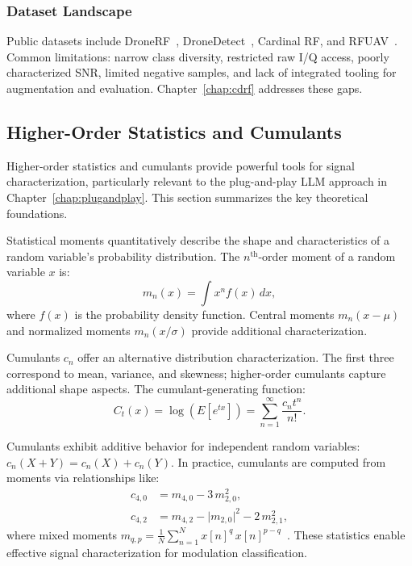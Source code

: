 \subsubsection{Dataset Landscape}

Public datasets include DroneRF~\cite{allahham2019dronerf}, DroneDetect~\cite{5jjj-1m32-21}, Cardinal RF, and RFUAV~\cite{rfuav}. Common limitations: narrow class diversity, restricted raw I/Q access, poorly characterized SNR, limited negative samples, and lack of integrated tooling for augmentation and evaluation. Chapter~\ref{chap:cdrf} addresses these gaps.


\subsection{Higher-Order Statistics and Cumulants}
\label{sec:higher_order_stats}

Higher-order statistics and cumulants provide powerful tools for signal characterization, particularly relevant to the plug-and-play LLM approach in Chapter~\ref{chap:plugandplay}. This section summarizes the key theoretical foundations.

Statistical moments quantitatively describe the shape and characteristics of a random variable's probability distribution. The $n^{\mathrm{th}}$-order moment of a random variable $x$ is:
\begin{equation}
    m_n(x) = \int x^n f(x) \, dx,
\end{equation}
where $f(x)$ is the probability density function. Central moments $m_n(x-\mu)$ and normalized moments $m_n(x/\sigma)$ provide additional characterization.

Cumulants $c_n$ offer an alternative distribution characterization. The first three correspond to mean, variance, and skewness; higher-order cumulants capture additional shape aspects. The cumulant-generating function:
\begin{equation}
    C_t(x) = \log\left(E\left[e^{tx}\right]\right) = \sum_{n=1}^{\infty} \frac{c_n t^n}{n!}.
\end{equation}

Cumulants exhibit additive behavior for independent random variables: $c_n(X+Y) = c_n(X) + c_n(Y)$. In practice, cumulants are computed from moments via relationships like:
\begin{align}
  c_{4,0} &= m_{4,0} - 3\,m_{2,0}^2,\\
  c_{4,2} &= m_{4,2} - \lvert m_{2,0}\rvert^2 - 2\,m_{2,1}^2,
\end{align}
where mixed moments $m_{q,p} = \frac{1}{N} \sum_{n=1}^{N} x[n]^q \, x[n]^{p-q}$~\cite{AZZOUZ199555}. These statistics enable effective signal characterization for modulation classification.

